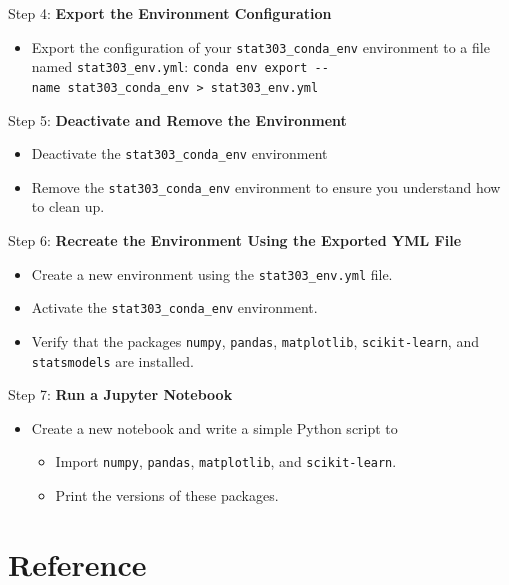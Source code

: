 \documentclass[
  letterpaper,
  DIV=11,
  numbers=noendperiod]{scrreprt}
\providecommand{\tightlist}{%
  \setlength{\itemsep}{0pt}\setlength{\parskip}{0pt}}\usepackage{longtable,booktabs,array}
\begin{document}
Step 4: \textbf{Export the Environment Configuration}

\begin{itemize}
\tightlist
\item
  Export the configuration of your \texttt{stat303\_conda\_env}
  environment to a file named \texttt{stat303\_env.yml}:
  \texttt{conda\ env\ export\ -\/-name\ stat303\_conda\_env\ \textgreater{}\ stat303\_env.yml}
\end{itemize}

Step 5: \textbf{Deactivate and Remove the Environment}

\begin{itemize}
\item
  Deactivate the \texttt{stat303\_conda\_env} environment
\item
  Remove the \texttt{stat303\_conda\_env} environment to ensure you
  understand how to clean up.
\end{itemize}

Step 6: \textbf{Recreate the Environment Using the Exported YML File}

\begin{itemize}
\tightlist
\item
  Create a new environment using the \texttt{stat303\_env.yml} file.
\item
  Activate the \texttt{stat303\_conda\_env} environment.
\item
  Verify that the packages \texttt{numpy}, \texttt{pandas},
  \texttt{matplotlib}, \texttt{scikit-learn}, and \texttt{statsmodels}
  are installed.
\end{itemize}

Step 7: \textbf{Run a Jupyter Notebook}

\begin{itemize}
\tightlist
\item
  Create a new notebook and write a simple Python script to

  \begin{itemize}
  \tightlist
  \item
    Import \texttt{numpy}, \texttt{pandas}, \texttt{matplotlib}, and
    \texttt{scikit-learn}.
  \item
    Print the versions of these packages.
  \end{itemize}
\end{itemize}

\hypertarget{reference}{%
\section{Reference}\label{reference}}
\end{document}
